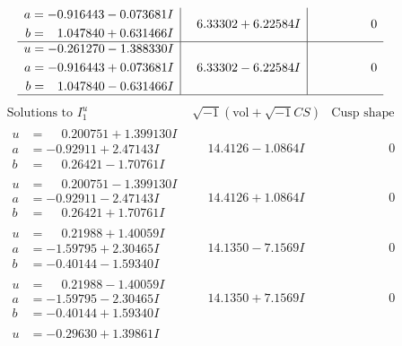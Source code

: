 \documentclass[1p]{elsarticle_modified}
\theoremstyle{definition}
\newcommand{\I}{\sqrt{-1}}
\begin{document}
$$\begin{array}{c|c|c}
\begin{aligned}
a &= -0.916443 - 0.073681 I \\
b &= \phantom{-}1.047840 + 0.631466 I\end{aligned}
 & \phantom{-}6.33302 + 6.22584 I & \phantom{-0.000000 } 0 \\ \hline\begin{aligned}
u &= -0.261270 - 1.388330 I \\
a &= -0.916443 + 0.073681 I \\
b &= \phantom{-}1.047840 - 0.631466 I\end{aligned}
 & \phantom{-}6.33302 - 6.22584 I & \phantom{-0.000000 } 0\\
 \hline 
 \end{array}$$\newpage$$\begin{array}{c|c|c}  
\text{Solutions to }I^u_{1}& \I (\text{vol} + \sqrt{-1}CS) & \text{Cusp shape}\\
 \hline 
\begin{aligned}
u &= \phantom{-}0.200751 + 1.399130 I \\
a &= -0.92911 + 2.47143 I \\
b &= \phantom{-}0.26421 - 1.70761 I\end{aligned}
 & \phantom{-}14.4126 - 1.0864 I & \phantom{-0.000000 } 0 \\ \hline\begin{aligned}
u &= \phantom{-}0.200751 - 1.399130 I \\
a &= -0.92911 - 2.47143 I \\
b &= \phantom{-}0.26421 + 1.70761 I\end{aligned}
 & \phantom{-}14.4126 + 1.0864 I & \phantom{-0.000000 } 0 \\ \hline\begin{aligned}
u &= \phantom{-}0.21988 + 1.40059 I \\
a &= -1.59795 + 2.30465 I \\
b &= -0.40144 - 1.59340 I\end{aligned}
 & \phantom{-}14.1350 - 7.1569 I & \phantom{-0.000000 } 0 \\ \hline\begin{aligned}
u &= \phantom{-}0.21988 - 1.40059 I \\
a &= -1.59795 - 2.30465 I \\
b &= -0.40144 + 1.59340 I\end{aligned}
 & \phantom{-}14.1350 + 7.1569 I & \phantom{-0.000000 } 0 \\ \hline\begin{aligned}
u &= -0.29630 + 1.39861 I \\

\end{aligned}
\end{array}$$
\end{document}
